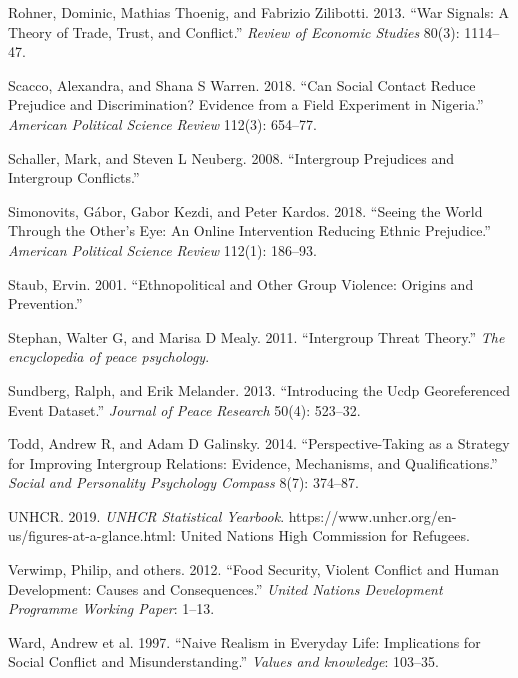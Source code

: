 \documentclass[11pt]{article}
\begin{document}
\leavevmode\hypertarget{ref-rohner2013war}{}%
Rohner, Dominic, Mathias Thoenig, and Fabrizio Zilibotti. 2013. ``War
Signals: A Theory of Trade, Trust, and Conflict.'' \emph{Review of
Economic Studies} 80(3): 1114--47.

\leavevmode\hypertarget{ref-scacco2018nigeria}{}%
Scacco, Alexandra, and Shana S Warren. 2018. ``Can Social Contact Reduce
Prejudice and Discrimination? Evidence from a Field Experiment in
Nigeria.'' \emph{American Political Science Review} 112(3): 654--77.

\leavevmode\hypertarget{ref-schaller2008intergroup}{}%
Schaller, Mark, and Steven L Neuberg. 2008. ``Intergroup Prejudices and
Intergroup Conflicts.''

\leavevmode\hypertarget{ref-simonovits2018seeing}{}%
Simonovits, Gábor, Gabor Kezdi, and Peter Kardos. 2018. ``Seeing the
World Through the Other's Eye: An Online Intervention Reducing Ethnic
Prejudice.'' \emph{American Political Science Review} 112(1): 186--93.

\leavevmode\hypertarget{ref-staub2001ethnopolitical}{}%
Staub, Ervin. 2001. ``Ethnopolitical and Other Group Violence: Origins
and Prevention.''

\leavevmode\hypertarget{ref-stephan2011intergroupThreat}{}%
Stephan, Walter G, and Marisa D Mealy. 2011. ``Intergroup Threat
Theory.'' \emph{The encyclopedia of peace psychology}.

\leavevmode\hypertarget{ref-ucdp}{}%
Sundberg, Ralph, and Erik Melander. 2013. ``Introducing the Ucdp
Georeferenced Event Dataset.'' \emph{Journal of Peace Research} 50(4):
523--32.

\leavevmode\hypertarget{ref-todd2014perspective}{}%
Todd, Andrew R, and Adam D Galinsky. 2014. ``Perspective-Taking as a
Strategy for Improving Intergroup Relations: Evidence, Mechanisms, and
Qualifications.'' \emph{Social and Personality Psychology Compass} 8(7):
374--87.

\leavevmode\hypertarget{ref-unhcr2019}{}%
UNHCR. 2019. \emph{UNHCR Statistical Yearbook}.
https://www.unhcr.org/en-us/figures-at-a-glance.html: United Nations
High Commission for Refugees.

\leavevmode\hypertarget{ref-verwimp2012food}{}%
Verwimp, Philip, and others. 2012. ``Food Security, Violent Conflict and
Human Development: Causes and Consequences.'' \emph{United Nations
Development Programme Working Paper}: 1--13.

\leavevmode\hypertarget{ref-ward1997naive}{}%
Ward, Andrew et al. 1997. ``Naive Realism in Everyday Life: Implications
for Social Conflict and Misunderstanding.'' \emph{Values and knowledge}:
103--35.
\end{document}
